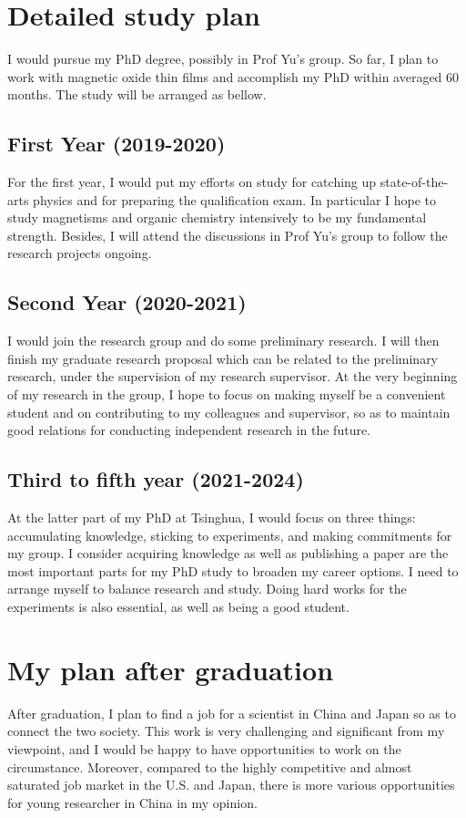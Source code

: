 \documentclass[aps,prb,reprint]{revtex4-1}
\begin{document}
\section{Detailed study plan}
I would pursue my PhD degree, possibly in Prof Yu’s group. So far, I plan to work with magnetic oxide thin films and accomplish my PhD within averaged 60 months. The study will be arranged as bellow. 

\subsection{First Year (2019-2020)}
For the first year, I would put my efforts on study for catching up state-of-the-arts physics and for preparing the qualification exam. In particular I hope to study magnetisms and organic chemistry intensively to be my fundamental strength. Besides, I will attend the discussions in Prof Yu's group to follow the research projects ongoing. 

\subsection{Second Year (2020-2021)}
I would join the research group and do some preliminary research. I will then finish my graduate research proposal which can be related to the preliminary research, under the supervision of my research supervisor.  At the very beginning of my research in the group, I hope to focus on making myself be a convenient student and on contributing to my colleagues and supervisor, so as to maintain good relations for conducting independent research in the future. 

\subsection{Third to fifth year (2021-2024)}
At the latter part of my PhD at Tsinghua, I would focus on three things: accumulating knowledge, sticking to experiments, and making commitments for my group. I consider acquiring knowledge as well as publishing a paper are the most important parts for my PhD study to broaden my career options. I need to arrange myself to balance research and study. Doing hard works for the experiments is also essential, as well as being a good student.

\section{My plan after graduation}
After graduation, I plan to find a job for a scientist in China and Japan so as to connect the two society.  This work is very challenging and significant from my viewpoint, and I would be happy to have opportunities to work on the circumstance. Moreover, compared to the highly competitive and almost saturated job market in the U.S. and Japan, there is more various opportunities for young researcher in China in my opinion. 



\end{document}
